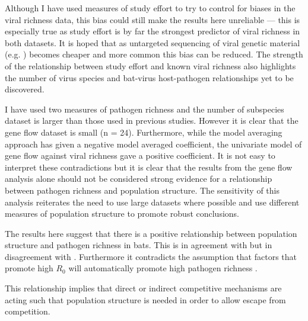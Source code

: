 
Although I have used measures of study effort to try to control for biases in the viral richness data, this bias could still make the results here unreliable --- this is especially true as study effort is by far the strongest predictor of viral richness in both datasets.
It is hoped that as untargeted sequencing of viral genetic material (e.g. \cite{anthony2013strategy}) becomes cheaper and more common this bias can be reduced.
The strength of the relationship between study effort and known viral richness also highlights the number of virus species and bat-virus host-pathogen relationships yet to be discovered.

I have used two measures of pathogen richness and the number of subspecies dataset is larger than those used in previous studies.
However it is clear that the gene flow dataset is small (n = 24).
Furthermore, while the model averaging approach has given a negative model averaged coefficient, the univariate model of gene flow against viral richness gave a positive coefficient.
It is not easy to interpret these contradictions but it is clear that the results from the gene flow analysis alone should not be considered strong evidence for a relationship between pathogen richness and population structure.
The sensitivity of this analysis reiterates the need to use large datasets where possible and use different measures of population structure to promote robust conclusions.


The results here suggest that there is a positive relationship between population structure and pathogen richness in bats.
This is in agreement with \cite{maganga2014bat, turmelle2009correlates} but in disagreement with \cite{gay2014parasite}.
Furthermore it contradicts the assumption that factors that promote high $R_0$ will automatically promote high pathogen richness \cite{nunn2003comparative, morand2000wormy}.

This relationship implies that direct or indirect competitive mechanisms are acting such that population structure is needed in order to allow escape from competition.

